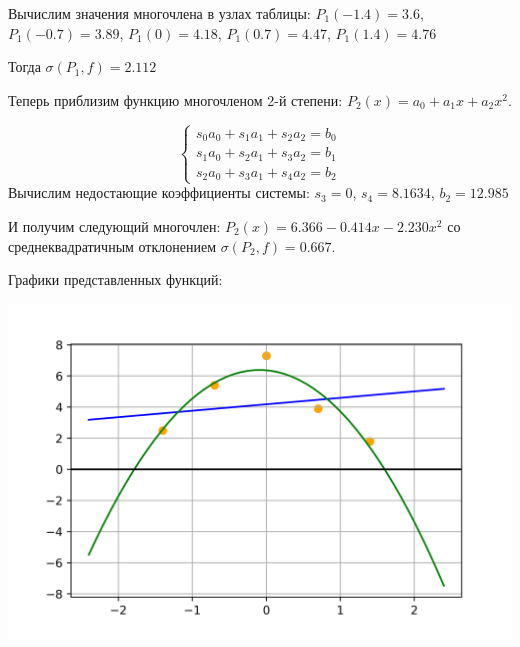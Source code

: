 \documentclass[a4paper,12pt]{report} %
\begin{document}
Вычислим значения многочлена в узлах таблицы: $P_1(-1.4) = 3.6$, $P_1(-0.7) = 3.89$, $P_1(0) = 4.18$, $P_1(0.7) = 4.47$, $P_1(1.4) = 4.76$

Тогда $\sigma(P_1, f) = 2.112$

Теперь приблизим функцию многочленом 2-й степени: $P_2(x) = a_0 + a_1x + a_2x^2$.

\[
	\left\{
		\begin{aligned}
		s_0a_0 + s_1a_1 + s_2a_2= b_0  \\
		s_1a_0 + s_2a_1 + s_3a_2= b_1 \\
		s_2a_0 + s_3a_1 + s_4a_2 = b_2
		\end{aligned}
	\right.
\]
Вычислим недостающие коэффициенты системы: $s_3 = 0$, $s_4 = 8.1634$, $b_2 = 12.985$

И получим следующий многочлен: $P_2(x) = 6.366 - 0.414x-2.230x^2$ со среднеквадратичным отклонением $\sigma(P_2, f) = 0.667$.

Графики представленных функций:

\includegraphics{regular_calc_13.png}
\end{document}
